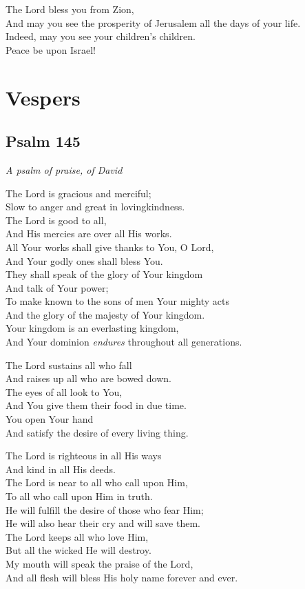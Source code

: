 \documentclass[14pt]{extbook}
\begin{document}
The Lord bless you from Zion,\\
And may you see the prosperity of Jerusalem all the days of your life.\\
Indeed, may you see your children's children.\\
Peace be upon Israel!

\newpage
\hypertarget{vespers}{%
\section{Vespers}\label{vespers}}

\hypertarget{psalm-145}{%
\subsection{Psalm 145}\label{psalm-145}}

\emph{A psalm of praise, of David}

The Lord is gracious and merciful;\\
Slow to anger and great in lovingkindness.\\
The Lord is good to all,\\
And His mercies are over all His works.\\
All Your works shall give thanks to You, O Lord,\\
And Your godly ones shall bless You.\\
They shall speak of the glory of Your kingdom\\
And talk of Your power;\\
To make known to the sons of men Your mighty acts\\
And the glory of the majesty of Your kingdom.\\
Your kingdom is an everlasting kingdom,\\
And Your dominion \emph{endures} throughout all generations.

The Lord sustains all who fall\\
And raises up all who are bowed down.\\
The eyes of all look to You,\\
And You give them their food in due time.\\
You open Your hand\\
And satisfy the desire of every living thing.

The Lord is righteous in all His ways\\
And kind in all His deeds.\\
The Lord is near to all who call upon Him,\\
To all who call upon Him in truth.\\
He will fulfill the desire of those who fear Him;\\
He will also hear their cry and will save them.\\
The Lord keeps all who love Him,\\
But all the wicked He will destroy.\\
My mouth will speak the praise of the Lord,\\
And all flesh will bless His holy name forever and ever.
\end{document}
